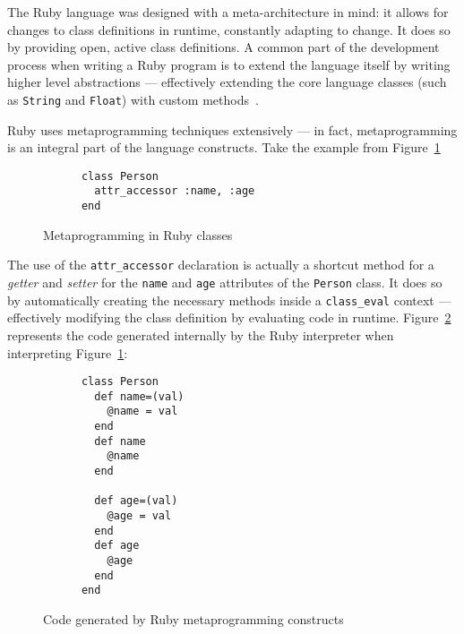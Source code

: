The Ruby language was designed with a meta-architecture in mind: it allows for changes to class definitions in runtime, constantly adapting to change. It does so by providing open, active class definitions. A common part of the development process when writing a Ruby program is to extend the language itself by writing higher level abstractions --- effectively extending the core language classes (such as \verb!String! and \verb!Float!) with custom methods~\cite{metaprogramming_ruby}.

Ruby uses metaprogramming techniques extensively --- in fact, metaprogramming is an integral part of the language constructs. Take the example from Figure~\ref{fig:ruby_class_metaprogramming}

\begin{figure}[H]
  \centering
  \begin{minipage}{9cm}
    \begin{verbatim}
      class Person
        attr_accessor :name, :age
      end
    \end{verbatim}
  \end{minipage}
  \caption{Metaprogramming in Ruby classes}
  \label{fig:ruby_class_metaprogramming}
\end{figure}

The use of the \verb!attr_accessor! declaration is actually a shortcut method for a \emph{getter} and \emph{setter} for the \verb!name! and \verb!age! attributes of the \verb!Person! class. It does so by automatically creating the necessary methods inside a \verb!class_eval! context --- effectively modifying the class definition by evaluating code in runtime. Figure~\ref{fig:ruby_class_metaprogramming_after} represents the code generated internally by the Ruby interpreter when interpreting Figure~\ref{fig:ruby_class_metaprogramming}:

\begin{figure}[H]
  \centering
  \begin{minipage}{7cm}
    \begin{verbatim}
      class Person
        def name=(val)
          @name = val
        end
        def name
          @name
        end
        
        def age=(val)
          @age = val
        end
        def age
          @age
        end
      end
    \end{verbatim}
  \end{minipage}
  \caption{Code generated by Ruby metaprogramming constructs}
  \label{fig:ruby_class_metaprogramming_after}
\end{figure}

